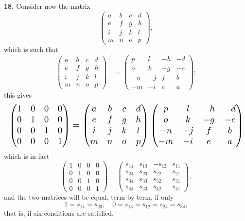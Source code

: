 \documentclass[11pt]{article}
\begin{document}
\textbf{18.} Consider now the matrix
\[
\begin{pmatrix} a & b & c & d \\ e & f & g & h \\ i & j & k & l \\ m & n & o & p \end{pmatrix},
\]
which is such that
\[
\begin{pmatrix} a & b & c & d \\ e & f & g & h \\ i & j & k & l \\ m & n & o & p \end{pmatrix}^{-1} = \begin{pmatrix} p & l & -h & -d \\ o & k & -g & -c \\ -n & -j & f & b \\ -m & -i & e & a \end{pmatrix};
\]
this gives
\[
\resizebox{\textwidth}{!}{$\displaystyle
\begin{pmatrix} 1 & 0 & 0 & 0 \\ 0 & 1 & 0 & 0 \\ 0 & 0 & 1 & 0 \\ 0 & 0 & 0 & 1 \end{pmatrix}
= \begin{pmatrix} a & b & c & d \\ e & f & g & h \\ i & j & k & l \\ m & n & o & p \end{pmatrix} \begin{pmatrix} p & l & -h & -d \\ o & k & -g & -c \\ -n & -j & f & b \\ -m & -i & e & a \end{pmatrix}
$}
\]
which is in fact
\[
\begin{pmatrix} 1 & 0 & 0 & 0 \\ 0 & 1 & 0 & 0 \\ 0 & 0 & 1 & 0 \\ 0 & 0 & 0 & 1 \end{pmatrix}
= \begin{pmatrix} s_{14} & s_{13} & -s_{12} & s_{11} \\ s_{24} & s_{23} & s_{22} & s_{21} \\ s_{34} & s_{33} & s_{32} & s_{31} \\ s_{44} & s_{43} & s_{42} & s_{41} \end{pmatrix},
\]
and the two matrices will be equal, term by term, if only
\[
1 = s_{14} = s_{23},\quad 0 = s_{13} = s_{12} = s_{24} = s_{34},
\]
that is, if six conditions are satisfied.
\end{document}
